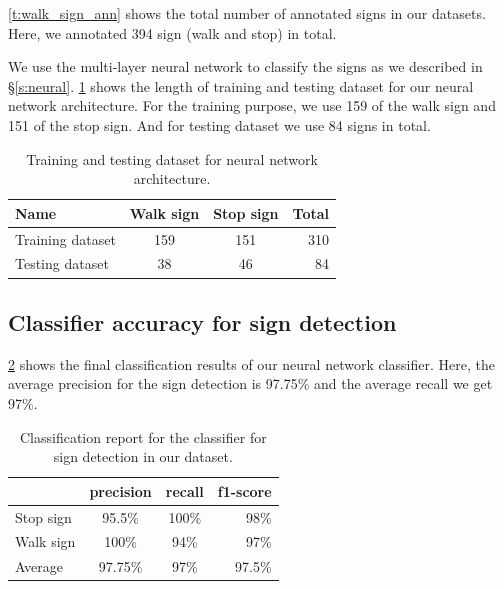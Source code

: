 \ref{t:walk_sign_ann} shows the total number of annotated signs in our datasets.
Here, we annotated 394 sign (walk and stop) in total.

We use the multi-layer neural network to classify the signs as we described in \S\ref{s:neural}.
\ref{t:training_neural} shows the length of training and testing dataset for our neural network architecture.
For the training purpose, we use 159 of the walk sign and 151 of the stop sign.
And for testing dataset we use 84 signs in total.

\begin{table}[ht!]
  \centering
  
  \begin{tabular}{  l  c  c  r}
    \rowcolor{gray!50}
    Name & Walk sign & Stop sign & Total \\
    \hline
    Training dataset & 159 & 151 & 310\\ %
    Testing dataset & 38 & 46 & 84 \\%
   
    \hline
  \end{tabular}
  \caption{Training and testing dataset for neural network architecture.}
  \label{t:training_neural}
\end{table}

\subsection{Classifier accuracy for sign detection}

\ref{t:report_walk} shows the final classification results of our neural network classifier.
Here, the average precision for the sign detection is 97.75\% and the average recall we get 97\%.

\begin{table}[h!]
  \centering
  
  \begin{tabular}{  l  c  c  r }
    \rowcolor{gray!50}
     & precision & recall & f1-score \\
    \hline
    Stop sign & 95.5\% & 100\% & 98\% \\
    Walk sign & 100\% & 94\% & 97\% \\
    \hline  
    Average & 97.75\% & 97\% & 97.5\% \\
  \end{tabular}
  \caption{Classification report for the classifier for sign detection in our dataset.}
  \label{t:report_walk}
\end{table}

